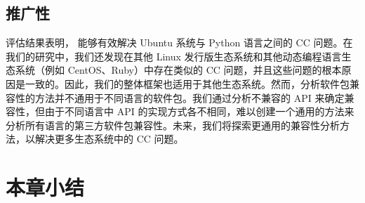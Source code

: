 \subsection{推广性}
评估结果表明，\tool{} 能够有效解决 Ubuntu 系统与 Python 语言之间的 CC 问题。在我们的研究中，我们还发现在其他 Linux 发行版生态系统和其他动态编程语言生态系统（例如 CentOS、Ruby）中存在类似的 CC 问题，并且这些问题的根本原因是一致的。因此，我们的整体框架也适用于其他生态系统。然而，分析软件包兼容性的方法并不通用于不同语言的软件包。我们通过分析不兼容的 API 来确定兼容性，但由于不同语言中 API 的实现方式各不相同，难以创建一个通用的方法来分析所有语言的第三方软件包兼容性。未来，我们将探索更通用的兼容性分析方法，以解决更多生态系统中的 CC 问题。

\section{本章小结}